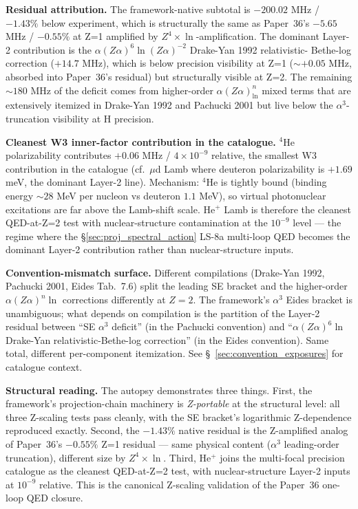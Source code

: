 \documentclass[11pt]{article}
\begin{document}
\textbf{Residual attribution.}  The framework-native subtotal is
$-200.02$ MHz / $-1.43\%$ below experiment, which is structurally the
same as Paper~36's $-5.65$ MHz / $-0.55\%$ at Z=1 amplified by
$Z^4 \times \ln$-amplification.  The dominant Layer-2 contribution is
the $\alpha(Z\alpha)^6 \ln(Z\alpha)^{-2}$ Drake-Yan 1992 relativistic-
Bethe-log correction ($+14.7$ MHz), which is below precision visibility
at Z=1 ($\sim +0.05$ MHz, absorbed into Paper~36's residual) but
structurally visible at Z=2.  The remaining $\sim 180$ MHz of the deficit
comes from higher-order $\alpha(Z\alpha)^n_{\ln}$ mixed terms that are
extensively itemized in Drake-Yan 1992 and Pachucki 2001 but live
below the $\alpha^3$-truncation visibility at H precision.

\textbf{Cleanest W3 inner-factor contribution in the catalogue.}
${}^4$He polarizability contributes $+0.06$ MHz / $4 \times 10^{-9}$
relative, the smallest W3 contribution in the catalogue (cf.\
$\mu$d Lamb where deuteron polarizability is $+1.69$ meV, the
dominant Layer-2 line).  Mechanism: ${}^4$He is tightly bound (binding
energy $\sim 28$ MeV per nucleon vs deuteron $1.1$ MeV), so virtual
photonuclear excitations are far above the Lamb-shift scale.  He$^+$
Lamb is therefore the cleanest QED-at-Z=2 test with nuclear-structure
contamination at the $10^{-9}$ level --- the regime where the
\S\ref{sec:proj_spectral_action} LS-8a multi-loop QED becomes the
dominant Layer-2 contribution rather than nuclear-structure
inputs.

\textbf{Convention-mismatch surface.}  Different compilations
(Drake-Yan 1992, Pachucki 2001, Eides Tab.~7.6) split the leading
SE bracket and the higher-order $\alpha(Z\alpha)^n \ln$ corrections
differently at $Z = 2$.  The framework's $\alpha^3$ Eides bracket is
unambiguous; what depends on compilation is the partition of the
Layer-2 residual between ``SE $\alpha^3$ deficit'' (in the
Pachucki convention) and ``$\alpha(Z\alpha)^6 \ln$ Drake-Yan
relativistic-Bethe-log correction'' (in the Eides convention).  Same
total, different per-component itemization.  See
\S~\ref{sec:convention_exposures} for catalogue context.

\textbf{Structural reading.}  The autopsy demonstrates three things.
First, the framework's projection-chain machinery is \emph{Z-portable}
at the structural level: all three Z-scaling tests pass cleanly, with
the SE bracket's logarithmic Z-dependence reproduced exactly.
Second, the $-1.43\%$ native residual is the Z-amplified analog of
Paper~36's $-0.55\%$ Z=1 residual --- same physical content ($\alpha^3$
leading-order truncation), different size by $Z^4 \times \ln$.
Third, He$^+$ joins the multi-focal precision catalogue as the cleanest
QED-at-Z=2 test, with nuclear-structure Layer-2 inputs at $10^{-9}$
relative.  This is the canonical Z-scaling validation of the Paper~36
one-loop QED closure.
\end{document}

